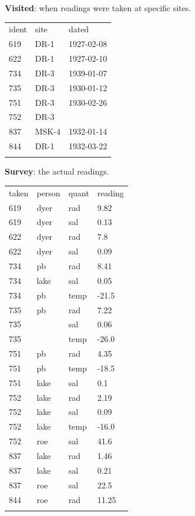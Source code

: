 \documentclass{book}
\begin{document}
\textbf{Visited}: when readings were taken at specific sites.

\begin{tabular}{lll}
\hline\noalign{\medskip}
ident & site & dated
\\\noalign{\medskip}
\hline\noalign{\medskip}
619 & DR-1 & 1927-02-08
\\\noalign{\medskip}
622 & DR-1 & 1927-02-10
\\\noalign{\medskip}
734 & DR-3 & 1939-01-07
\\\noalign{\medskip}
735 & DR-3 & 1930-01-12
\\\noalign{\medskip}
751 & DR-3 & 1930-02-26
\\\noalign{\medskip}
752 & DR-3 & ~
\\\noalign{\medskip}
837 & MSK-4 & 1932-01-14
\\\noalign{\medskip}
844 & DR-1 & 1932-03-22
\\\noalign{\medskip}
\hline
\end{tabular}

\textbf{Survey}: the actual readings.

\begin{tabular}{llll}
\hline\noalign{\medskip}
taken & person & quant & reading
\\\noalign{\medskip}
\hline\noalign{\medskip}
619 & dyer & rad & 9.82
\\\noalign{\medskip}
619 & dyer & sal & 0.13
\\\noalign{\medskip}
622 & dyer & rad & 7.8
\\\noalign{\medskip}
622 & dyer & sal & 0.09
\\\noalign{\medskip}
734 & pb & rad & 8.41
\\\noalign{\medskip}
734 & lake & sal & 0.05
\\\noalign{\medskip}
734 & pb & temp & -21.5
\\\noalign{\medskip}
735 & pb & rad & 7.22
\\\noalign{\medskip}
735 & ~ & sal & 0.06
\\\noalign{\medskip}
735 & ~ & temp & -26.0
\\\noalign{\medskip}
751 & pb & rad & 4.35
\\\noalign{\medskip}
751 & pb & temp & -18.5
\\\noalign{\medskip}
751 & lake & sal & 0.1
\\\noalign{\medskip}
752 & lake & rad & 2.19
\\\noalign{\medskip}
752 & lake & sal & 0.09
\\\noalign{\medskip}
752 & lake & temp & -16.0
\\\noalign{\medskip}
752 & roe & sal & 41.6
\\\noalign{\medskip}
837 & lake & rad & 1.46
\\\noalign{\medskip}
837 & lake & sal & 0.21
\\\noalign{\medskip}
837 & roe & sal & 22.5
\\\noalign{\medskip}
844 & roe & rad & 11.25
\\\noalign{\medskip}
\hline
\end{tabular}
\end{document}
